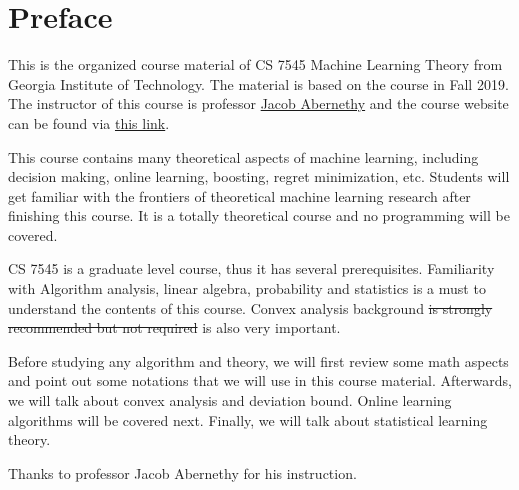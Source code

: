 \documentclass[../main.tex]{subfiles}
\begin{document}
\chapter*{Preface}

This is the organized course material of CS 7545 Machine Learning Theory from Georgia Institute of Technology. The material is based on the course in Fall 2019. The instructor of this course is professor \href{https://www.cc.gatech.edu/~jabernethy9/}{Jacob Abernethy} and the course website can be found via \href{https://mltheory.github.io/CS7545/}{this link}.

This course contains many theoretical aspects of machine learning, including decision making, online learning, boosting, regret minimization, etc. Students will get familiar with the frontiers of theoretical machine learning research after finishing this course. It is a totally theoretical course and no programming will be covered.

CS 7545 is a graduate level course, thus it has several prerequisites. Familiarity with Algorithm analysis, linear algebra, probability and statistics is a must to understand the contents of this course. Convex analysis background \sout{is strongly recommended but not required} is also very important.

Before studying any algorithm and theory, we will first review some math aspects and point out some notations that we will use in this course material. Afterwards, we will talk about convex analysis and deviation bound. Online learning algorithms will be covered next. Finally, we will talk about statistical learning theory. 

Thanks to professor Jacob Abernethy for his instruction.
\end{document}
